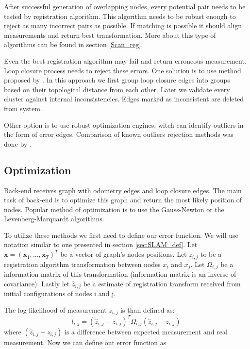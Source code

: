 After successful generation of overlapping nodes, every potential pair needs to be tested by registration algorithm. This algorithm needs to be robust enough to reject as many incorrect pairs as possible. If matching is possible it should align measurements and return best transformation. More about this type of algorithms can be found in section \ref{Scan_reg}.

Even the best registration algorithm may fail and return erroneous measurement. Loop closure process needs to reject these errors. One solution is to use method proposed by \cite{Olson2009Loop}. In this approach we first group loop closure edges into groups based on their topological distance from each other. Later we validate every cluster against internal inconsistencies. Edges marked as inconsistent are deleted from system. 

Other option is to use robust optimization engines, witch can identify outliers in the form of error edges. Comparison of known outliers rejection methods was done by \cite{RobustOpt}. 


\newpage

\subsection{Optimization}
Back-end receives graph with odometry edges and loop closure edges. The main task of back-end is to optimize this graph and return the most likely position of nodes. Popular method of optimization is to use the Gauss-Newton or the Levenberg-Marquardt algorithms. 

To utilize these methods we first need to define our error function. We will use notation similar to one presented in section \ref{sec:SLAM_def}. Let $\textbf{x} = (\textbf{x}_{1},...,\textbf{x}_{T})^{T} $ be a vector of graph's nodes positions. Let $z_{i,j}$ to be a registration algorithm transformation between nodes $x_{i}$ and $x_{j}$. Let $\Omega_{i,j}$ be a information matrix of this transformation (information matrix is an inverse of covariance). Lastly let $\hat{z}_{i,j}$ be a estimate of registration transform received from initial configurations of nodes i and j.

The log-likelihood of measurement $z_{i,j}$ is than defined as:
\begin{equation}
l_{i,j} = (\hat{z}_{i,j} - z_{i,j})^{T} \Omega_{i,j} (\hat{z}_{i,j} - z_{i,j}) 
\end{equation}  
where $(\hat{z}_{i,j} - z_{i,j})$ is a difference between expected measurement and real measurement. Now we can define out error function as

